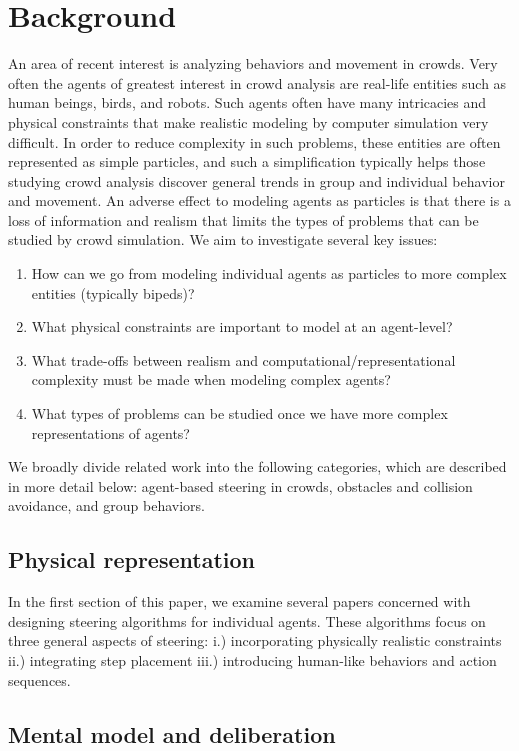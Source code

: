 \documentclass[tog]{acmsiggraph}
\begin{document}
\section{Background}

An area of recent interest is analyzing behaviors and movement in crowds. Very often the agents of greatest interest in crowd analysis are real-life entities such as human beings, birds, and robots. Such agents often have many intricacies and physical constraints that make realistic modeling by computer simulation very difficult. In order to reduce complexity in such problems, these entities are often represented as simple particles, and such a simplification typically helps those studying crowd analysis discover general trends in group and individual behavior and movement. An adverse effect to modeling agents as particles is that there is a loss of information and realism that limits the types of problems that can be studied by crowd simulation. We aim to investigate several key issues:
\begin{enumerate}
\item How can we go from modeling individual agents as particles to more complex entities (typically bipeds)?
\item What physical constraints are important to model at an agent-level?
\item What trade-offs between realism and computational/representational complexity must be made when modeling complex agents?
\item What types of problems can be studied once we have more complex representations of agents?
\end{enumerate}

We broadly divide related work into the following categories, which are described in more detail below: agent-based steering in crowds, obstacles and collision avoidance, and group behaviors.

\subsection{Physical representation}

In the first section of this paper, we examine several papers concerned with designing steering algorithms for individual agents. These algorithms focus on three general aspects of steering: i.) incorporating physically realistic constraints ii.) integrating step placement iii.) introducing human-like behaviors and action sequences.

\subsection{Mental model and deliberation}
\end{document}
